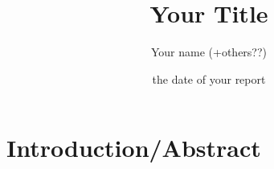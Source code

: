\documentclass[10pt]{report}
\title{\Huge\bfseries{Your Title}}
\author{Your name (+others??)}
\date{the date of your report}
\begin{document}
\maketitle

\chapter*{Introduction/Abstract}

\large{
  \lipsum[1]
}

\newpage

\tableofcontents

\normalsize


\newpage

\end{document}

